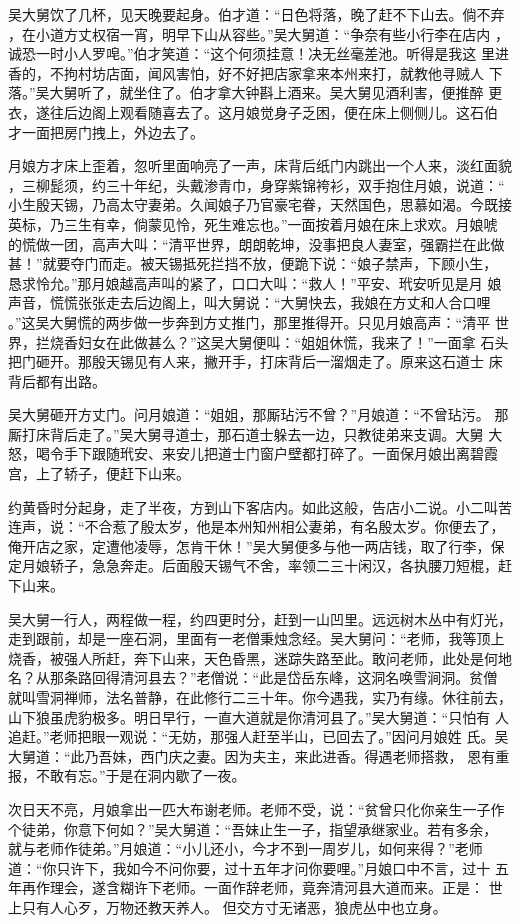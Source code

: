 吴大舅饮了几杯，见天晚要起身。伯才道：“日色将落，晚了赶不下山去。倘不弃
，在小道方丈权宿一宵，明早下山从容些。”吴大舅道：“争奈有些小行李在店内
，诚恐一时小人罗唣。”伯才笑道：“这个何须挂意！决无丝毫差池。听得是我这
里进香的，不拘村坊店面，闻风害怕，好不好把店家拿来本州来打，就教他寻贼人
下落。”吴大舅听了，就坐住了。伯才拿大钟斟上酒来。吴大舅见酒利害，便推醉
更衣，遂往后边阁上观看随喜去了。这月娘觉身子乏困，便在床上侧侧儿。这石伯
才一面把房门拽上，外边去了。

月娘方才床上歪着，忽听里面响亮了一声，床背后纸门内跳出一个人来，淡红面貌
，三柳髭须，约三十年纪，头戴渗青巾，身穿紫锦袴衫，双手抱住月娘，说道：“
小生殷天锡，乃高太守妻弟。久闻娘子乃官豪宅眷，天然国色，思慕如渴。今既接
英标，乃三生有幸，倘蒙见怜，死生难忘也。”一面按着月娘在床上求欢。月娘唬
的慌做一团，高声大叫：“清平世界，朗朗乾坤，没事把良人妻室，强霸拦在此做
甚！”就要夺门而走。被天锡抵死拦挡不放，便跪下说：“娘子禁声，下顾小生，
恳求怜允。”那月娘越高声叫的紧了，口口大叫：“救人！”平安、玳安听见是月
娘声音，慌慌张张走去后边阁上，叫大舅说：“大舅快去，我娘在方丈和人合口哩
。”这吴大舅慌的两步做一步奔到方丈推门，那里推得开。只见月娘高声：“清平
世界，拦烧香妇女在此做甚么？”这吴大舅便叫：“姐姐休慌，我来了！”一面拿
石头把门砸开。那殷天锡见有人来，撇开手，打床背后一溜烟走了。原来这石道士
床背后都有出路。

吴大舅砸开方丈门。问月娘道：“姐姐，那厮玷污不曾？”月娘道：“不曾玷污。
那厮打床背后走了。”吴大舅寻道士，那石道士躲去一边，只教徒弟来支调。大舅
大怒，喝令手下跟随玳安、来安儿把道士门窗户壁都打碎了。一面保月娘出离碧霞
宫，上了轿子，便赶下山来。

约黄昏时分起身，走了半夜，方到山下客店内。如此这般，告店小二说。小二叫苦
连声，说：“不合惹了殷太岁，他是本州知州相公妻弟，有名殷太岁。你便去了，
俺开店之家，定遭他凌辱，怎肯干休！”吴大舅便多与他一两店钱，取了行李，保
定月娘轿子，急急奔走。后面殷天锡气不舍，率领二三十闲汉，各执腰刀短棍，赶
下山来。

吴大舅一行人，两程做一程，约四更时分，赶到一山凹里。远远树木丛中有灯光，
走到跟前，却是一座石洞，里面有一老僧秉烛念经。吴大舅问：“老师，我等顶上
烧香，被强人所赶，奔下山来，天色昏黑，迷踪失路至此。敢问老师，此处是何地
名？从那条路回得清河县去？”老僧说：“此是岱岳东峰，这洞名唤雪涧洞。贫僧
就叫雪洞禅师，法名普静，在此修行二三十年。你今遇我，实乃有缘。休往前去，
山下狼虽虎豹极多。明日早行，一直大道就是你清河县了。”吴大舅道：“只怕有
人追赶。”老师把眼一观说：“无妨，那强人赶至半山，已回去了。”因问月娘姓
氏。吴大舅道：“此乃吾妹，西门庆之妻。因为夫主，来此进香。得遇老师搭救，
恩有重报，不敢有忘。”于是在洞内歇了一夜。

次日天不亮，月娘拿出一匹大布谢老师。老师不受，说：“贫曾只化你亲生一子作
个徒弟，你意下何如？”吴大舅道：“吾妹止生一子，指望承继家业。若有多余，
就与老师作徒弟。”月娘道：“小儿还小，今才不到一周岁儿，如何来得？”老师
道：“你只许下，我如今不问你要，过十五年才问你要哩。”月娘口中不言，过十
五年再作理会，遂含糊许下老师。一面作辞老师，竟奔清河县大道而来。正是：
世上只有人心歹，万物还教天养人。
但交方寸无诸恶，狼虎丛中也立身。